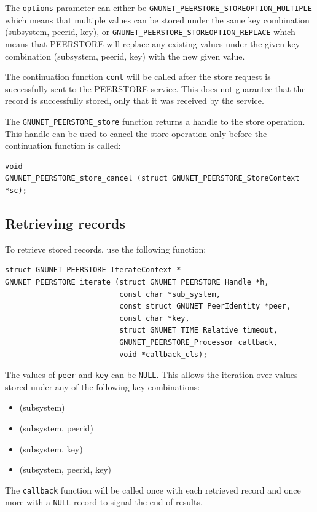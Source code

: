 \documentclass[10pt]{article}
\begin{document}
The \lstinline|options| parameter can either be \lstinline|GNUNET_PEERSTORE_STOREOPTION_MULTIPLE|
which means that multiple values can be stored under the same key combination (subsystem, peerid, key),
or \lstinline|GNUNET_PEERSTORE_STOREOPTION_REPLACE| which means that PEERSTORE will replace any
existing values under the given key combination (subsystem, peerid, key) with the new given value.

The continuation function \lstinline|cont| will be called after the store request is successfully
sent to the PEERSTORE service. This does not guarantee that the record is successfully stored, only
that it was received by the service.

The \lstinline|GNUNET_PEERSTORE_store| function returns a handle to the store operation. This handle
can be used to cancel the store operation only before the continuation function is called:
\begin{lstlisting}
void
GNUNET_PEERSTORE_store_cancel (struct GNUNET_PEERSTORE_StoreContext *sc);
\end{lstlisting}

\subsection{Retrieving records}

To retrieve stored records, use the following function:
\begin{lstlisting}
struct GNUNET_PEERSTORE_IterateContext *
GNUNET_PEERSTORE_iterate (struct GNUNET_PEERSTORE_Handle *h,
                          const char *sub_system,
                          const struct GNUNET_PeerIdentity *peer,
                          const char *key,
                          struct GNUNET_TIME_Relative timeout,
                          GNUNET_PEERSTORE_Processor callback,
                          void *callback_cls);
\end{lstlisting}
The values of \lstinline|peer| and \lstinline|key| can be \lstinline|NULL|. This allows the
iteration over values stored under any of the following key combinations:
\begin{itemize}
\itemsep0em
  \item (subsystem)
  \item (subsystem, peerid)
  \item (subsystem, key)
  \item (subsystem, peerid, key)
\end{itemize}

The \lstinline|callback| function will be called once with each retrieved record and once
more with a \lstinline|NULL| record to signal the end of results.
\end{document}
